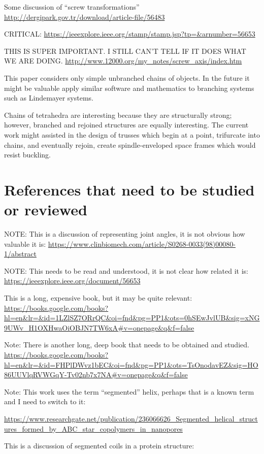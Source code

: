 \documentclass[11pt]{article}
\begin{document}
{Some discussion of ``screw transformations''
\url{http://dergipark.gov.tr/download/article-file/56483}

CRITICAL:
\url{https://ieeexplore.ieee.org/stamp/stamp.jsp?tp=&arnumber=56653}


THIS IS SUPER IMPORTANT. I STILL CAN'T TELL IF IT DOES WHAT WE ARE DOING.
\url{http://www.12000.org/my_notes/screw_axis/index.htm}

This paper considers only simple unbranched chains of objects. In the
future it might be valuable apply similar software and mathematics to
branching systems such as Lindemayer systems\cite{prusinkiewicz2013lindenmayer}.

Chains of tetrahedra are interesting because they are structurally strong;
however, branched and rejoined structures are equally interesting.
The current work might assisted in the design of trusses which begin at
a point, trifurcate into chains, and eventually rejoin, create spindle-enveloped
space frames which would resist buckling.

\section{References that need to be studied or reviewed}

NOTE: This is a discussion of representing joint angles, it is not obvious how valuable it is:
\url{https://www.clinbiomech.com/article/S0268-0033(98)00080-1/abstract}

NOTE: This needs to be read and understood, it is not clear how related it is:
\url{https://ieeexplore.ieee.org/document/56653}

This is a long, expensive book, but it may be quite relevant\cite{hyde1996language}:
\url{https://books.google.com/books?hl=en&lr=&id=1LZlSZ7ORrQC&oi=fnd&pg=PP1&ots=0hSEwJvlUB&sig=xNG9UWv_H1OXHwaOiOBJN7TW6xA#v=onepage&q&f=false}

Note: There is another long, deep book that needs to be obtained and studied\cite{sadoc2006geometrical}.
\url{https://books.google.com/books?hl=en&lr=&id=FHPlDWvz1bEC&oi=fnd&pg=PP1&ots=TsOnodavEZ&sig=HO86UUVlqRVWGqY-Tv02nb7x7NA#v=onepage&q&f=false}


Note: This work uses the term ``segmented'' helix, perhaps that is a known term and I need to switch to it:

\url{https://www.researchgate.net/publication/236066626_Segmented_helical_structures_formed_by_ABC_star_copolymers_in_nanopores}

This is a discussion of segmented coils in a protein structure:

}
\end{document}
